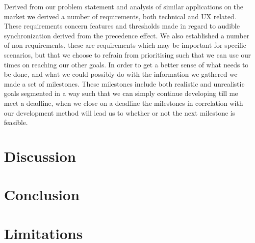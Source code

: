 Derived from our problem statement and analysis of similar applications on the market we derived a number of requirements, both technical and \ac{UX} related.
These requirements concern features and thresholds made in regard to audible synchronization derived from the precedence effect.
We also established a number of non-requirements, these are requirements which may be important for specific scenarios, but that we choose to refrain from prioritising such that we can use our times on reaching our other goals.
In order to get a better sense of what needs to be done, and what we could possibly do with the information we gathered we made a set of milestones.
These milestones include both realistic and unrealistic goals segmented in a way such that we can simply continue developing till me meet a deadline, when we close on a deadline the milestones in correlation with our development method will lead us to whether or not the next milestone is feasible.


\section{Discussion}
\section{Conclusion}
\section{Limitations}
